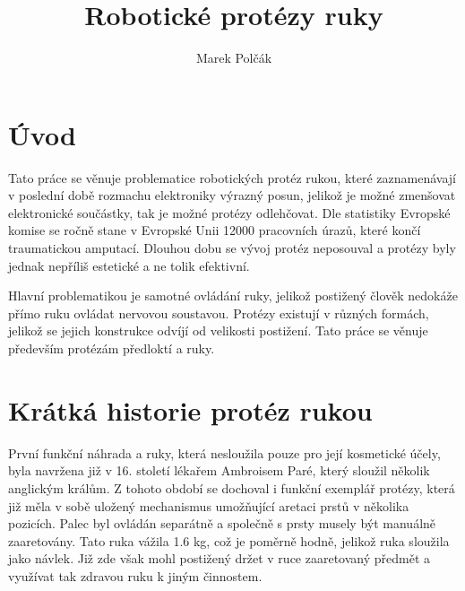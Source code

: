 \documentclass[a4paper,12pt]{article}
\author{Marek Polčák}
\begin{document}
\title{Robotické protézy ruky}
\maketitle

\section*{Úvod}

Tato práce se věnuje problematice robotických protéz rukou, které zaznamenávají v poslední době rozmachu elektroniky výrazný posun, jelikož je možné zmenšovat elektronické součástky, tak je možné protézy odlehčovat. Dle statistiky Evropské komise se ročně stane v Evropské Unii 12000 pracovních úrazů, které končí traumatickou amputací. Dlouhou dobu se vývoj protéz neposouval a protézy byly jednak nepříliš estetické a ne tolik efektivní.\cite{Euro}\par
 
Hlavní problematikou je samotné ovládání ruky, jelikož postižený člověk nedokáže přímo ruku ovládat nervovou soustavou. Protézy existují v různých formách, jelikož se jejich konstrukce odvíjí od velikosti postižení. Tato práce se věnuje především protézám předloktí a ruky.

\section{Krátká historie protéz rukou}

První funkční náhrada a ruky, která nesloužila pouze pro její kosmetické účely, byla navržena již v 16. století lékařem Ambroisem Paré, který sloužil několik anglickým králům. Z tohoto období se dochoval i funkční exemplář protézy, která již měla v sobě uložený mechanismus umožňující aretaci prstů v několika pozicích. Palec byl ovládán separátně a společně s prsty musely být manuálně zaaretovány. Tato ruka vážila 1.6 kg, což je poměrně hodně, jelikož ruka sloužila jako návlek. Již zde však mohl postižený držet v ruce zaaretovaný předmět a využívat tak zdravou ruku k jiným činnostem.\cite{Chappell}
\end{document}
